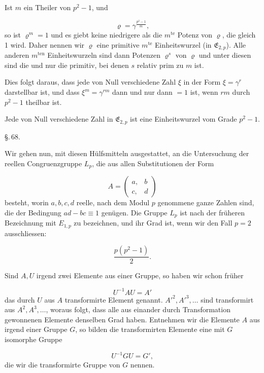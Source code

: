 
Ist $m$ ein Theiler von $p^2-1$, und

\[
\varrho = \gamma^{\frac{p^2-1}{m}},
\]
so ist $\varrho^m=1$ und es giebt keine niedrigere als die $m^{\mathrm{te}}$
Potenz von $\varrho$, die gleich 1 wird. Daher nennen wir $\varrho$ eine
primitive $m^{\mathrm{te}}$ Einheitswurzel (in $\mathfrak{E}_{2,p}$). Alle anderen $m^{\mathrm{ten}}$
Einheitswurzeln sind dann Potenzen $\varrho^s$ von $\varrho$ und unter diesen
sind die und nur die primitiv, bei denen $s$ relativ prim zu $m$ ist.

Dies folgt daraus, dass jede von Null verschiedene Zahl $\xi$
in der Form $\xi=\gamma^r$ darstellbar ist, und dass $\xi^m=\gamma^{rm}$ dann
und nur dann $=1$ ist, wenn $rm$ durch $p^2-1$ theilbar ist.

Jede von Null verschiedene Zahl in $\mathfrak{E}_{2,p}$ ist eine Einheitswurzel
 vom Grade $p^2-1$.

\begin{center}
\S.\,68.

\end{center}

Wir gehen nun, mit diesen Hülfsmitteln ausgestattet, an die
Untersuchung der reellen Congruenzgruppe $L_p$, die aus allen
Substitutionen der Form

\[
A = \begin{pmatrix} a, & b \\ c, & d \end{pmatrix}
\]
besteht, worin $a, b, c, d$ reelle, nach dem Modul $p$ genommene
ganze Zahlen sind, die der Bedingung $ad-bc\equiv 1$ genügen.
Die Gruppe $L_p$ ist nach der früheren Bezeichnung mit $E_{1,p}$ zu
bezeichnen, und ihr Grad ist, wenn wir den Fall $p=2$ ausschliessen:

\[
\frac{p(p^2-1)}{2}.
\]

Sind $A, U$ irgend zwei Elemente aus einer Gruppe, so haben
wir schon früher

\[
U^{-1}AU = A'
\]
das durch $U$ aus $A$ transformirte Element genannt. $A'^2, A'^3, \ldots$
sind transformirt aus $A^2, A^3, \ldots$, woraus folgt, dass alle aus
einander durch Transformation gewonnenen Elemente denselben
Grad haben. Entnehmen wir die Elemente $A$ aus irgend einer
Gruppe $G$, so bilden die transformirten Elemente eine mit $G$
isomorphe Gruppe

\[
U^{-1}GU = G',
\]
die wir die transformirte Gruppe von $G$ nennen.
